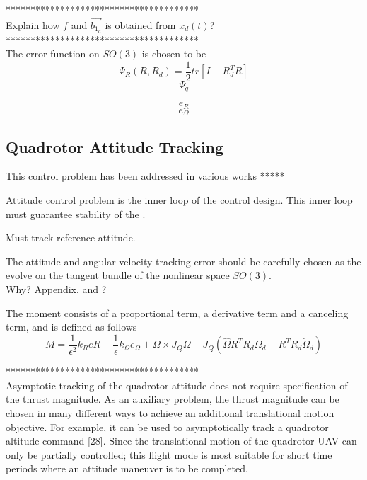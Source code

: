 ***************************************\\
Explain how $ f $ and $ \vec{b_{1_d}} $ is obtained from $ x_d(t) $?\\

***************************************\\

The error function on $ SO(3) $ is chosen to be \cite{Lee2010}
\begin{equation}\label{eq:errorfunc}
\Psi_R(R,R_d)=\frac{1}{2}tr\left[I-R_d^TR\right]
\end{equation}
\begin{equation}\label{key}
\Psi_q
\end{equation}

\begin{equation}\label{key}
e_R
\end{equation}
\begin{equation}\label{key}
e_\Omega 
\end{equation}


\subsection{Quadrotor Attitude Tracking}

This control problem has been addressed in various works *****

Attitude control problem is the inner loop of the control design. This inner loop must guarantee stability of the .

Must track reference attitude.

The attitude and angular velocity tracking error should be carefully chosen as the evolve on the tangent bundle of the nonlinear space $ SO(3) $. \cite{Lee2010}\\
Why? Appendix\cite{Lee2010}, and \cite{Bullo2005}?

The moment consists of a proportional term, a derivative term and a canceling term, and is defined as follows
\begin{equation}\label{key}
M = \frac{1}{\epsilon^2}k_ReR-\frac{1}{\epsilon}k_\Omega e_\Omega+\Omega\times J_Q\Omega-J_Q(\hat{\Omega}R^TR_d\Omega_d-R^TR_d\dot{\Omega}_d)
\end{equation}

***************************************\\
Asymptotic tracking of the quadrotor attitude does not require specification of the thrust magnitude. As an auxiliary problem, the thrust magnitude can be chosen in many different ways to achieve an additional translational motion objective. For example, it can be used to asymptotically track a quadrotor altitude command [28]. Since the translational motion of the quadrotor UAV can only be partially controlled; this flight mode is most suitable for short time periods where an attitude maneuver is to be completed. \cite{Goodarzi2015b}


